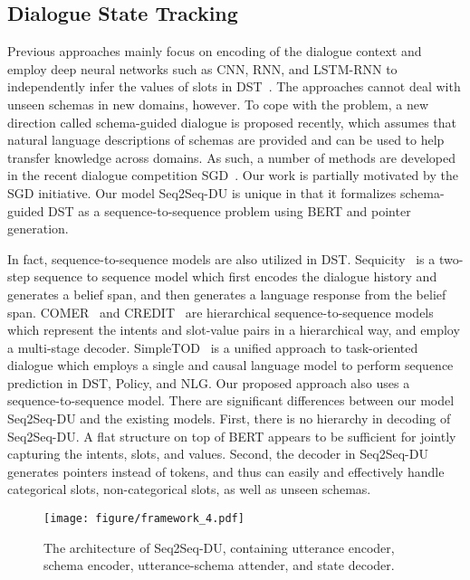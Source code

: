 \documentclass[11pt]{article}
\begin{document}
\subsection{Dialogue State Tracking}
Previous approaches mainly focus on encoding of the dialogue context and employ deep neural networks such as CNN, RNN, and LSTM-RNN to independently infer the values of slots in DST~\citep{mrkvsic2016neural, xu2018end, zhong2018global, ren2018towards, rastogi2017scalable, ramadan2018large, wu2019transferable, zhang2019find, heck2020trippy}. The approaches cannot deal with unseen schemas in new domains, however. To cope with the problem, a new direction called schema-guided dialogue is proposed recently, which assumes that natural language descriptions of schemas are provided and can be used to help transfer knowledge across domains. As such, a number of methods are developed in the recent dialogue competition SGD~\citep{rastogi2019towards, zang2020multiwoz, noroozi2020fast, chen2020schema}. 
Our work is partially motivated by the SGD initiative. Our model Seq2Seq-DU is unique in that it formalizes schema-guided DST as a sequence-to-sequence problem using BERT and pointer generation. 


In fact, sequence-to-sequence models are also utilized in DST. Sequicity~\citep{lei2018sequicity} is a two-step sequence to sequence model which first encodes the dialogue history and generates a belief span, and then generates a language response from the belief span. COMER~\citep{ren2019scalable} and CREDIT~\citep{chen2020credit} are hierarchical sequence-to-sequence models which represent the 
intents and slot-value pairs in a hierarchical way, and employ a multi-stage decoder. SimpleTOD~\citep{hosseini2020simple} is a unified approach to task-oriented dialogue which employs a single and causal language model to perform sequence prediction in DST, Policy, and NLG. Our proposed approach also uses a sequence-to-sequence model. There are significant differences between our model Seq2Seq-DU and the existing models. First, there is no hierarchy in decoding of Seq2Seq-DU. A flat structure on top of BERT appears to be sufficient for jointly capturing the intents, slots, and values. Second, the decoder in Seq2Seq-DU generates pointers instead of tokens, and thus can easily and effectively handle categorical slots, non-categorical slots, as well as unseen schemas.




\begin{figure*}[!t]
\centering
\texttt{[image: figure/framework\_4.pdf]}
\caption{The architecture of Seq2Seq-DU, containing utterance encoder, schema encoder, utterance-schema attender, and state decoder.}
\label{fig:encoder}
\end{figure*}
\end{document}
